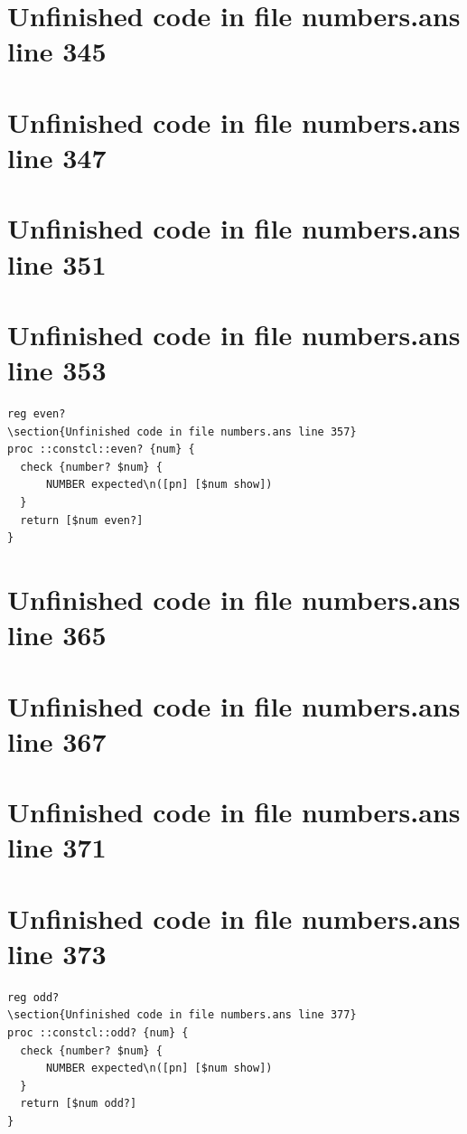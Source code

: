 \documentclass[twoside,9pt]{report}
\begin{document}
\section{Unfinished code in file numbers.ans line 345}
\section{Unfinished code in file numbers.ans line 347}
\section{Unfinished code in file numbers.ans line 351}
\section{Unfinished code in file numbers.ans line 353}
\begin{lstlisting}
reg even?
\section{Unfinished code in file numbers.ans line 357}
proc ::constcl::even? {num} {
  check {number? $num} {
      NUMBER expected\n([pn] [$num show])
  }
  return [$num even?]
}
\end{lstlisting}
\section{Unfinished code in file numbers.ans line 365}
\section{Unfinished code in file numbers.ans line 367}
\section{Unfinished code in file numbers.ans line 371}
\section{Unfinished code in file numbers.ans line 373}
\begin{lstlisting}
reg odd?
\section{Unfinished code in file numbers.ans line 377}
proc ::constcl::odd? {num} {
  check {number? $num} {
      NUMBER expected\n([pn] [$num show])
  }
  return [$num odd?]
}
\end{lstlisting}
\end{document}
